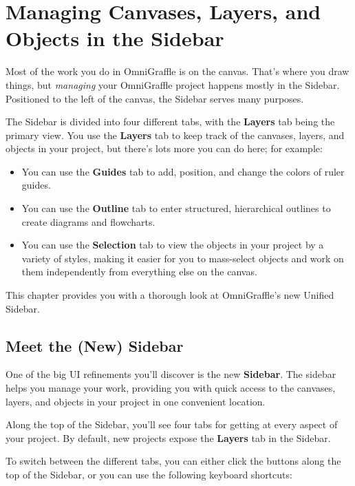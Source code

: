 \documentclass[../main.tex]{subfiles}
\begin{document}
\chapter{Managing Canvases, Layers, and Objects in the Sidebar}

Most of the work you do in OmniGraffle is on the canvas. That's where you draw things, but
\textit{managing} your OmniGraffle project happens mostly in the Sidebar. Positioned to the
left of the canvas, the Sidebar serves many purposes.

The Sidebar is divided into four different tabs, with the \textbf{Layers} tab being the primary
view. You use the \textbf{Layers} tab to keep track of the canvases, layers, and objects in
your project, but there's lots more you can do here; for example:

\begin{itemize}
  \item You can use the \textbf{Guides} tab to add, position, and change the colors of ruler
    guides.
  \item You can use the \textbf{Outline} tab to enter structured, hierarchical outlines to
    create diagrams and flowcharts.
  \item You can use the \textbf{Selection} tab to view the objects in your project by a variety
    of styles, making it easier for you to mass-select objects and work on them independently
    from everything else on the canvas.
\end{itemize}

This chapter provides you with a thorough look at OmniGraffle's new Unified Sidebar.

\section{Meet the (New) Sidebar}

One of the big UI refinements you'll discover is the new \textbf{Sidebar}. The sidebar helps you
manage your work, providing you with quick access to the canvases, layers, and objects in your
project in one convenient location.

Along the top of the Sidebar, you'll see four tabs for getting at every aspect of your project.
By default, new projects expose the \textbf{Layers} tab in the Sidebar.


To switch between the different tabs, you can either click the buttons along the top of the
Sidebar, or you can use the following keyboard shortcuts:
\end{document}
